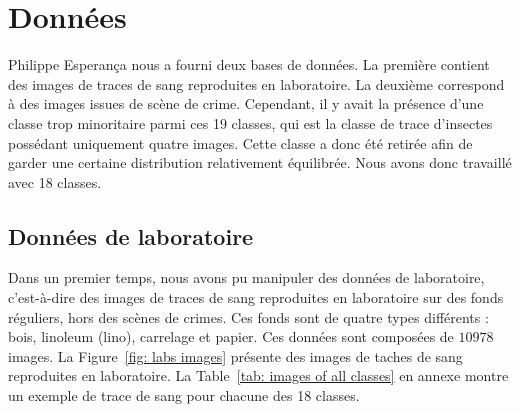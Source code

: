 \documentclass[a4paper]{article}
\begin{document}
\section{Données}

Philippe Esperança nous a fourni deux bases de données. La première contient des images de traces de sang reproduites en laboratoire. La deuxième correspond à des images issues de scène de crime.
Cependant, il y avait la présence d'une classe trop minoritaire parmi ces 19 classes, qui est la classe de trace d'insectes possédant uniquement quatre images. Cette classe a donc été retirée afin de garder une certaine distribution relativement équilibrée. Nous avons donc travaillé avec 18 classes.

\subsection{Données de laboratoire}

Dans un premier temps, nous avons pu manipuler des données de laboratoire, c'est-à-dire des images de traces de sang reproduites en laboratoire sur des fonds réguliers, hors des scènes de crimes. Ces fonds sont de quatre types différents : bois, linoleum (lino), carrelage et papier. Ces données sont composées de $10978$ images.
La Figure~\ref{fig: labs images} présente des images de taches de sang reproduites en laboratoire. La Table~\ref{tab: images of all classes} en annexe montre un exemple de trace de sang pour chacune des 18 classes.
\end{document}
